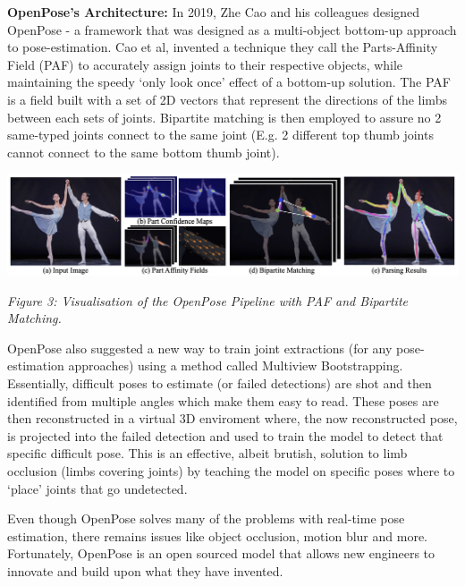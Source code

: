 \documentclass[11pt]{article}
\def\paraskip{\vskip 0.4cm}
\begin{document}
        \paraskip
        \noindent\textbf{OpenPose's Architecture: } In 2019, Zhe Cao and his colleagues designed OpenPose - a framework that was designed as a multi-object bottom-up approach to pose-estimation. Cao et al, invented a technique they call the Parts-Affinity Field (PAF) to accurately assign joints to their respective objects, while maintaining the speedy `only look once' effect of a bottom-up solution. The PAF is a field built with a set of 2D vectors that represent the directions of the limbs between each sets of joints. Bipartite matching is then employed to assure no 2 same-typed joints connect to the same joint (E.g. 2 different top thumb joints cannot connect to the same bottom thumb joint).

        \vskip 0.2cm
        \begin{center}
            \includegraphics[width=14cm]{images/openpose.png}
            \\
            \raggedright \textit{
            Figure 3: Visualisation of the OpenPose Pipeline with PAF and Bipartite Matching.
            }
            \cite{openpose}
        \end{center}
        \vskip 0.2cm

        OpenPose also suggested a new way to train joint extractions (for any pose-estimation approaches) using a method called Multiview Bootstrapping. Essentially, difficult poses to estimate (or failed detections) are shot and then identified from multiple angles which make them easy to read. These poses are then reconstructed in a virtual 3D enviroment where, the now reconstructed pose, is projected into the failed detection and used to train the model to detect that specific difficult pose. This is an effective, albeit brutish, solution to limb occlusion (limbs covering joints) by teaching the model on specific poses where to `place' joints that go undetected.

        Even though OpenPose solves many of the problems with real-time pose estimation, there remains issues like object occlusion, motion blur and more. Fortunately, OpenPose is an open sourced model that allows new engineers to innovate and build upon what they have invented.
\end{document}
